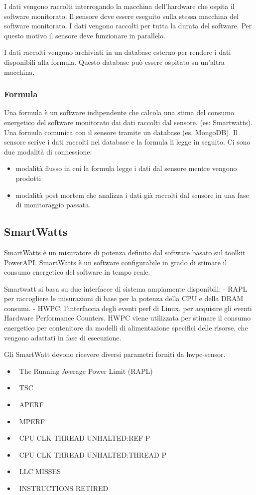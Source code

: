 \documentclass[a4paper, 11pt]{article}
\begin{document}
I dati vengono raccolti interrogando la macchina dell'hardware che ospita il software monitorato. Il sensore deve essere eseguito sulla stessa macchina del software monitorato. I dati vengono raccolti per tutta la durata del software. Per questo motivo il sensore deve funzionare in parallelo.

I dati raccolti vengono archiviati in un database esterno per rendere i dati disponibili alla formula. Questo database può essere ospitato su un'altra macchina.
\subsubsection{Formula}
Una formula è un software indipendente che calcola una stima del consumo energetico del software monitorato dai dati raccolti dal sensore. (es: Smartwatts).
Una formula comunica con il sensore tramite un database (es. MongoDB). Il sensore scrive i dati raccolti nel database e la formula li legge in seguito.
Ci sono due modalità di connessione:
\begin{itemize}
\item modalità flusso in cui la formula legge i dati dal sensore mentre vengono prodotti
\item   modalità post mortem che analizza i dati già raccolti dal sensore in una fase di monitoraggio passata.
\end{itemize}
  

\subsection{SmartWatts}
SmartWatts è un misuratore di potenza definito dal software basato sul toolkit PowerAPI. SmartWatts è un software configurabile in grado di stimare il consumo energetico del software in tempo reale. 

Smartwatt si basa su due interfacce di sistema ampiamente disponibili: - RAPL per raccogliere le misurazioni di base per la potenza della CPU e della DRAM consumi.
- HWPC, l'interfaccia degli eventi perf di Linux. per acquisire gli eventi Hardware Performance Counters. HWPC viene utilizzata per stimare il consumo energetico per contenitore da modelli di alimentazione specifici delle risorse, che vengono adattati in fase di esecuzione.


Gli SmartWatt devono ricevere diversi parametri forniti da hwpc-sensor.
\begin{itemize}
\item   \ The Running Average Power Limit (RAPL)
\item   \ TSC
\item  \ APERF
\item   \ MPERF
\item    \ CPU CLK THREAD UNHALTED:REF P 
\item   \ CPU CLK THREAD UNHALTED:THREAD P 
\item   \ LLC MISSES 
\item   \ INSTRUCTIONS RETIRED 
\end{itemize}
\end{document}
